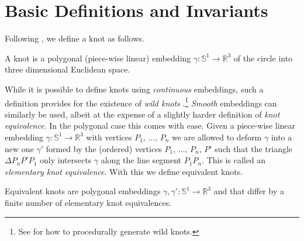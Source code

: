 \section{Basic Definitions and Invariants}
    Following \cite[p.~15]{LivingstonKnotTheory}, we define a knot as follows.
    \begin{definition}
        A knot is a polygonal (piece-wise linear) embedding
        $\gamma:\mathbb{S}^{1}\rightarrow\mathbb{R}^{3}$ of the circle into
        three dimensional Euclidean space.
    \end{definition}
    While it is possible to define knots using \textit{continuous} embeddings,
    such a definition provides for the existence of
    \textit{wild knots} \cite{FoxArtinWildKnots1948}.\footnote{%
        See \cite{BrowneWildKnots} for how to procedurally generate wild knots.
    }
    \textit{Smooth} embeddings can similarly be used, albeit at the expense of
    a slightly harder definition of \textit{knot equivalence}. In the
    polygonal case this comes with ease. Given a piece-wise linear embedding
    $\gamma:\mathbb{S}^{1}\rightarrow\mathbb{R}^{3}$ with vertices
    $P_{1},\,\dots,\,P_{n}$ we are allowed to deform $\gamma$ into a new one
    $\gamma'$ formed by the (ordered) vertices $P_{1},\,\dots,\,P_{n},\,P'$
    such that the triangle $\Delta{P}_{n}P'P_{1}$ only intersects $\gamma$
    along the line segment $\overline{P_{1}P_{n}}$. This is called an
    \textit{elementary knot equivalence}. With this we define equivalent knots.
    \begin{definition}
        Equivalent knots are polygonal embeddings
        $\gamma,\gamma':\mathbb{S}^{1}\rightarrow\mathbb{R}^{3}$ and
        that differ by
        a finite number of elementary knot equivalences.
    \end{definition}
    
